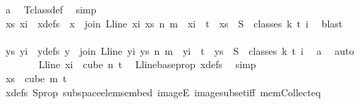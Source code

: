 \begin{isabellebody}
\ a\ \isamarkupfalse%
\ T{\isacharunderscore}{\kern0pt}class{\isacharunderscore}{\kern0pt}def\ \isamarkupfalse%
\ simp\isanewline
\ \ \ \ \ \ \isamarkupfalse%
\ \isamarkupfalse%
\ xs\ xi\ \ xdefs{\isacharcolon}{\kern0pt}\ \ {\isachardoublequoteopen}x\ {\isacharequal}{\kern0pt}\ join\ {\isacharparenleft}{\kern0pt}L{\isacharunderscore}{\kern0pt}line\ xi{\isacharparenright}{\kern0pt}\ xs\ n\ m\ {\isasymand}\ xi\ {\isacharless}{\kern0pt}\ t\ {\isasymand}\ xs\ {\isasymin}\ S\ {\isacharbackquote}{\kern0pt}\ {\isacharparenleft}{\kern0pt}classes\ k\ t\ i{\isacharparenright}{\kern0pt}{\isachardoublequoteclose}\ \isamarkupfalse%
\ blast\isanewline
\isanewline
\ \ \ \ \ \ \isamarkupfalse%
\ {\isacharasterisk}{\kern0pt}\ {\isacharasterisk}{\kern0pt}{\isacharasterisk}{\kern0pt}\ \isamarkupfalse%
\ ys\ yi\ \ ydefs{\isacharcolon}{\kern0pt}\ {\isachardoublequoteopen}y\ {\isacharequal}{\kern0pt}\ join\ {\isacharparenleft}{\kern0pt}L{\isacharunderscore}{\kern0pt}line\ yi{\isacharparenright}{\kern0pt}\ ys\ n\ m\ {\isasymand}\ yi\ {\isacharless}{\kern0pt}\ t\ {\isasymand}\ ys\ {\isasymin}\ S\ {\isacharbackquote}{\kern0pt}\ {\isacharparenleft}{\kern0pt}classes\ k\ t\ i{\isacharparenright}{\kern0pt}{\isachardoublequoteclose}\ \isamarkupfalse%
\ a\ \isamarkupfalse%
\ auto\isanewline
\isanewline
\ \ \ \ \ \ \isamarkupfalse%
\ {\isachardoublequoteopen}{\isacharparenleft}{\kern0pt}L{\isacharunderscore}{\kern0pt}line\ xi{\isacharparenright}{\kern0pt}\ {\isasymin}\ cube\ n\ {\isacharparenleft}{\kern0pt}t{\isacharplus}{\kern0pt}{}{\isacharparenright}{\kern0pt}{\isachardoublequoteclose}\ \isamarkupfalse%
\ L{\isacharunderscore}{\kern0pt}line{\isacharunderscore}{\kern0pt}base{\isacharunderscore}{\kern0pt}prop\ xdefs\ \isamarkupfalse%
\ simp\isanewline
\ \ \ \ \ \ \isamarkupfalse%
\ \isamarkupfalse%
\ {\isachardoublequoteopen}xs\ {\isasymin}\ cube\ m\ {\isacharparenleft}{\kern0pt}t{\isacharplus}{\kern0pt}{}{\isacharparenright}{\kern0pt}{\isachardoublequoteclose}\ \isamarkupfalse%
\ xdefs\ S{\isacharunderscore}{\kern0pt}prop\ subspace{\isacharunderscore}{\kern0pt}elems{\isacharunderscore}{\kern0pt}embed\ imageE\ image{\isacharunderscore}{\kern0pt}subset{\isacharunderscore}{\kern0pt}iff\ mem{\isacharunderscore}{\kern0pt}Collect{\isacharunderscore}{\kern0pt}eq\ \isamarkupfalse%

\end{isabellebody}
